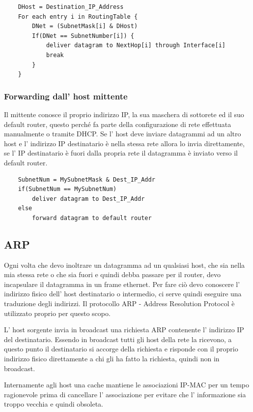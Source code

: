 \begin{verbatim}
    DHost = Destination_IP_Address
    For each entry i in RoutingTable {
        DNet = (SubnetMask[i] & DHost)
        If(DNet == SubnetNumber[i]) {
            deliver datagram to NextHop[i] through Interface[i]
            break
        }
    }
\end{verbatim}

\subsubsection{Forwarding dall' host mittente}
Il mittente conosce il proprio indirizzo IP, la sua maschera di sottorete ed il suo default router, questo perché fa parte della configurazione di rete effettuata manualmente o tramite DHCP.
Se l' host deve inviare datagrammi ad un altro host e l' indirizzo IP destinatario è nella stessa rete allora lo invia direttamente, se l' IP destinatario è fuori dalla propria rete il datagramma è inviato verso il default router.
\begin{verbatim}
    SubnetNum = MySubnetMask & Dest_IP_Addr
    if(SubnetNum == MySubnetNum)
        deliver datagram to Dest_IP_Addr
    else
        forward datagram to default router
\end{verbatim}

\subsection{ARP}
Ogni volta che devo inoltrare un datagramma ad un qualsiasi host, che sia nella mia stessa rete o che sia fuori e quindi debba passare per il router, devo incapsulare il datagramma in un frame ethernet.
Per fare ciò devo conoscere l' indirizzo fisico dell' host destinatario o intermedio, ci serve quindi eseguire una traduzione degli indirizzi.
Il protocollo ARP - Address Resolution Protocol è utilizzato proprio per questo scopo.

L' host sorgente invia in broadcast una richiesta ARP contenente l' indirizzo IP del destinatario.
Essendo in broadcast tutti gli host della rete la ricevono, a questo punto il destinatario si accorge della richiesta e risponde con il proprio indirizzo fisico direttamente a chi gli ha fatto la richiesta, quindi non in broadcast.

Internamente agli host una cache mantiene le associazioni IP-MAC per un tempo ragionevole prima di cancellare l' associazione per evitare che l' informazione sia troppo vecchia e quindi obsoleta.


